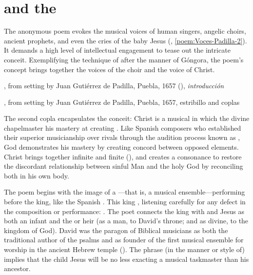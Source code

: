 \section[\quoted{Voices of the Chapel Choir}]
{ and the }

The anonymous poem evokes the musical voices of human singers, angelic choirs,
ancient prophets, and even the cries of the baby Jesus
(, \ref{poem:Voces-Padilla-2}).%
    \Autocite[37--38, 119--132]{Cashner:WLSCM32}
It demands a high level of intellectual engagement to tease out the intricate
conceit.
Exemplifying the technique of  after the manner of Góngora,
the poem's concept brings together the voices of the choir and the voice of
Christ.


{, from setting by Juan Gutiérrez
de Padilla, Puebla, 1657 (), \emph{introducción}}

{, from setting by Juan Gutiérrez de Padilla,
Puebla, 1657, estribillo and coplas}

The second copla encapsulates the conceit: Christ is a musical
 in which the divine chapelmaster  his
mastery at creating .
Like Spanish composers who established their superior musicianship over rivals
through the audition process known as , God demonstrates his
mastery by creating concord between opposed elements.
Christ brings together infinite and finite (), and
creates a consonance to restore the discordant relationship between sinful Man
and the holy God by reconciling both in his own body.


The poem begins with the image of a ---that is, a musical
ensemble---performing before the king, like the Spanish .
This king , listening carefully for any defect in the
composition or performance: .
The poet connects the king with  and Jesus
as both an infant and the  or heir (as a man, to David's throne;
and as divine, to the kingdom of God).
David was the paragon of Biblical musicians as both the traditional author of
the psalms and as founder of the first musical ensemble for worship in the
ancient Hebrew temple ().
The phrase  (in the manner or style of) implies that the
child Jesus will be no less exacting a musical taskmaster than his ancestor.

